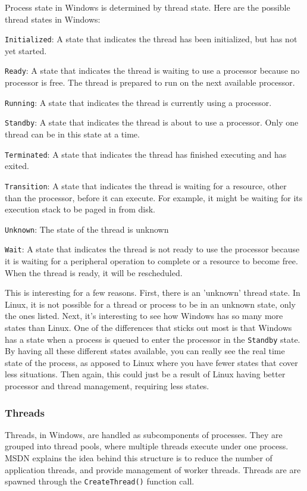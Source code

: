 \documentclass[10pt,letterpaper,onecolumn,draftclsnofoot]{IEEEtran}
\begin{document}
Process state in Windows is determined by thread state. Here are the possible
thread states in Windows:\cite{msthreadstate2016}
\begin{description}
	\item \texttt{Initialized}: A state that indicates the thread has been initialized,
	but has not yet started.
	\item \texttt{Ready}: A state that indicates the thread is waiting to use a processor
	because no processor is free. The thread is prepared to run on the next
	available processor.
	\item \texttt{Running}: A state that indicates the thread is currently using a processor.
	\item \texttt{Standby}: A state that indicates the thread is about to use a processor.
	Only one thread can be in this state at a time.
	\item \texttt{Terminated}: A state that indicates the thread has finished executing
	and has exited.
	\item \texttt{Transition}: A state that indicates the thread is waiting for a resource, other than
	the processor, before it can execute. For example, it might be waiting for its
	execution stack to be paged in from disk.
	\item \texttt{Unknown}: The state of the thread is unknown
	\item \texttt{Wait}: A state that indicates the thread is not ready to use the processor
	because it is waiting for a peripheral operation to complete or a resource to
	become free. When the thread is ready, it will be rescheduled.
\end{description}

This is interesting for a few reasons. First, there is an 'unknown' thread state.
In Linux, it is not possible for a thread or process to be in an unknown state,
only the ones listed. Next, it's interesting to see how Windows has so many more
states than Linux. One of the differences that sticks out most is that Windows
has a state when a process is queued to enter the processor in the \texttt{Standby}
state.
By having all these different states available, you can really see the real time
state of the process, as apposed to Linux where you have fewer states that cover
less situations. Then again, this could just be a result of Linux having better
processor and thread management, requiring less states.


\subsubsection{Threads}
Threads, in Windows, are handled as subcomponents of processes. They are grouped
into thread pools, where multiple threads execute under one process. MSDN explains
the idea behind this structure is to reduce the number of application threads, and
provide management of worker threads. Threads are are spawned through the
\texttt{CreateThread()} function call.\cite{msthreadcreate2016}
\end{document}
